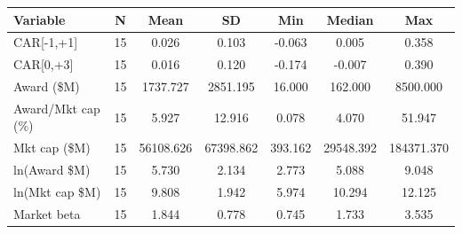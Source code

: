 \begin{tabular}{lcccccc}
\toprule
Variable & N & Mean & SD & Min & Median & Max \\
\midrule
CAR[-1,+1] & 15 & 0.026 & 0.103 & -0.063 & 0.005 & 0.358 \\
CAR[0,+3] & 15 & 0.016 & 0.120 & -0.174 & -0.007 & 0.390 \\
Award (\$M) & 15 & 1737.727 & 2851.195 & 16.000 & 162.000 & 8500.000 \\
Award/Mkt cap (\%) & 15 & 5.927 & 12.916 & 0.078 & 4.070 & 51.947 \\
Mkt cap (\$M) & 15 & 56108.626 & 67398.862 & 393.162 & 29548.392 & 184371.370 \\
ln(Award \$M) & 15 & 5.730 & 2.134 & 2.773 & 5.088 & 9.048 \\
ln(Mkt cap \$M) & 15 & 9.808 & 1.942 & 5.974 & 10.294 & 12.125 \\
Market beta & 15 & 1.844 & 0.778 & 0.745 & 1.733 & 3.535 \\
\bottomrule
\end{tabular}